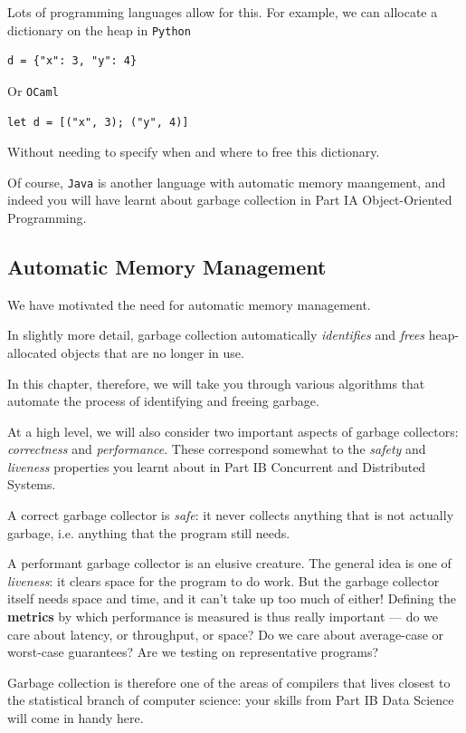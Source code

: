 Lots of programming languages allow for this. For example, we can allocate a dictionary on the heap in \texttt{Python}

\begin{verbatim}
d = {"x": 3, "y": 4}
\end{verbatim}
Or \texttt{OCaml}
\begin{verbatim}
let d = [("x", 3); ("y", 4)]
\end{verbatim}
Without needing to specify when and where to free this dictionary.

Of course, \texttt{Java} is another language with automatic memory maangement, and indeed you will have learnt about garbage collection in \textsf{Part IA Object-Oriented Programming}.

\subsection{Automatic Memory Management}
We have motivated the need for automatic memory management.

In slightly more detail, garbage collection automatically \textit{identifies} and \textit{frees} heap-allocated objects that are no longer in use. 

In this chapter, therefore, we will take you through various algorithms that automate the process of identifying and freeing garbage.

At a high level, we will also consider two important aspects of garbage collectors: \textit{correctness} and \textit{performance}. These correspond somewhat to the \textit{safety} and \textit{liveness} properties you learnt about in \textsf{Part IB Concurrent and Distributed Systems}.

A correct garbage collector is \textit{safe}: it never collects anything that is not actually garbage, i.e. anything that the program still needs.

A performant garbage collector is an elusive creature. The general idea is one of \textit{liveness}: it clears space for the program to do work. But the garbage collector itself needs space and time, and it can't take up too much of either! Defining the \textbf{metrics} by which performance is measured is thus really important --- do we care about latency, or throughput, or space? Do we care about average-case or worst-case guarantees? Are we testing on representative programs? 

Garbage collection is therefore one of the areas of compilers that lives closest to the statistical branch of computer science: your skills from \textsf{Part IB Data Science} will come in handy here.

